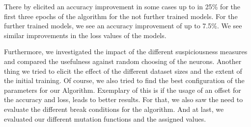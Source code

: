 There by elicited an accuracy improvement in some cases up to in 25\% for the first three epochs of the algorithm for the not further trained models.
For the further trained models, we see an accuracy improvement of up to 7.5\%.
We see similar improvements in the loss values of the models.

Furthermore, we investigated the impact of the different suspiciousness measures and compared the usefulness against random choosing of the neurons.
Another thing we tried to elicit the effect of the different dataset sizes and the extent of the initial training.
Of course, we also tried to find the best configuration of the parameters for our Algorithm.
Exemplary of this is if the usage of an offset for the accuracy and loss, leads to better results.
For that, we also saw the need to evaluate the different break conditions for the algorithm.
And at last, we evaluated our different mutation functions and the assigned values.